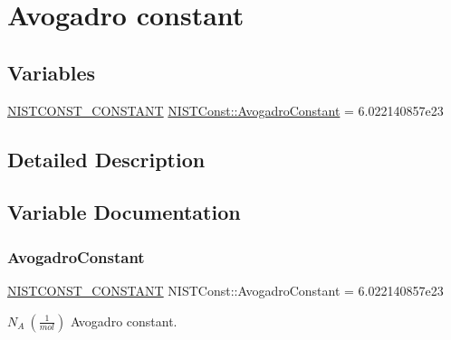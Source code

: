 \hypertarget{group___n_i_s_t_const-_avogadro_constant}{}\section{Avogadro constant}
\label{group___n_i_s_t_const-_avogadro_constant}
\subsection*{Variables}
\begin{DoxyCompactItemize}
\item 
\mbox{\hyperlink{group___n_i_s_t_const-_macros_ga2b0fc1d7452373f816175dd86ce26729}{N\+I\+S\+T\+C\+O\+N\+S\+T\+\_\+\+C\+O\+N\+S\+T\+A\+NT}} \mbox{\hyperlink{group___n_i_s_t_const-_avogadro_constant_ga6bfa56f26d113ff9445c87ab17462e8a}{N\+I\+S\+T\+Const\+::\+Avogadro\+Constant}} = 6.\+022140857e23
\end{DoxyCompactItemize}


\subsection{Detailed Description}


\subsection{Variable Documentation}
\mbox{\label{group___n_i_s_t_const-_avogadro_constant_ga6bfa56f26d113ff9445c87ab17462e8a}} 
\subsubsection{\texorpdfstring{Avogadro\+Constant}{AvogadroConstant}}
{\footnotesize\ttfamily \mbox{\hyperlink{group___n_i_s_t_const-_macros_ga2b0fc1d7452373f816175dd86ce26729}{N\+I\+S\+T\+C\+O\+N\+S\+T\+\_\+\+C\+O\+N\+S\+T\+A\+NT}} N\+I\+S\+T\+Const\+::\+Avogadro\+Constant = 6.\+022140857e23}

$N_A \ (\frac{1}{mol})$ Avogadro constant. 